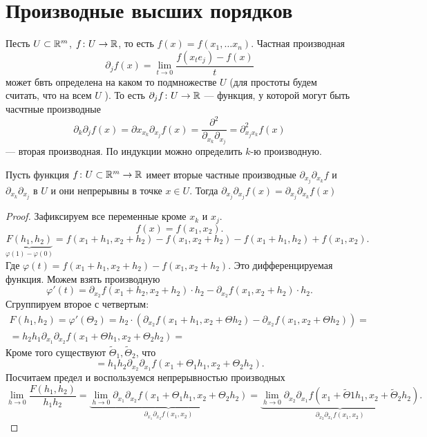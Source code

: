 \documentclass[11pt,dvipsnames]{report}
\begin{document}
\section{Производные высших порядков}
\begin{defn}
    Песть $ U \subset \mathbb{R}^{m} $, $ f\colon U \to  \mathbb{R}$, то есть $ f(x) = f(x_1, \ldots x_{n})$. Частная производная
    \[
	\partial _jf(x)  = \lim_{t \to  0} \frac{f(x_t e_j) - f(x)}{t}
    \] 
    может бвть определена на каком то подмножестве $ U$ (для простоты будем считать, что на всем  $ U$ ). То есть $ \partial _j f \colon U \to \mathbb{R}$ --- функция, у которой могут быть часчтные производные
    \[
	\partial _k \partial _j f(x) = \partial x_{x_k} \partial _{x_j}f(x) = \frac{\partial ^2}{\partial _{x_k} \partial _{x_j}} = \partial ^2_{x_j x_k} f(x)
    \] --- вторая производная. 
	По индукции можно определить  $ k$-ю производную.
\end{defn}
\begin{thm}
Пусть функция $ f\colon U \subset \mathbb{R}^{m} \to  \mathbb{R}$ имеет вторые частные производные  $ \partial _{x_j} \partial _{x_k} f$ и $ \partial _{x_k} \partial _{x_j}$ в $ U$ и они непрерывны в точке   $ x \in U$. Тогда $ \partial _{x_j} \partial _{   x_j} f(x) = \partial _{x_j} \partial _{  x_{k}}f(x)$
\end{thm}
\begin{proof}
    Зафиксируем все переменные кроме $ x_k$ и $ x_j$.
    \[
	f(x) = f(x_1, x_2)
    .\] 
    \[
	\underbrace{F(h_1, h_2)}_{ \varphi (1) - \varphi (0)} = f(x_1+h_1, x_2+h_2) - f(x_1, x_2+h_2) - f(x_1 + h_1, h_2) + f(x_1, x_2)
    .\] 
    Где $ \varphi (t) = f(x_1+h_1, x_2+h_2) - f(x_1, x_2+h_2)$.
    Это дифференцируемая функция. Можем взять производную
    \[
	\varphi '(t) = \partial _{x_2}f(x_1 + h_2, x_2+h_2) \cdot h_2 - \partial _{x_2}f(x_1, x_2+h_2)\cdot h_2 
    .\] 
    Сгруппируем второе с четвертым:
    $$
    \begin{aligned}
	F(h_1, h_2) = \varphi '( \Theta_2) = h_2  \cdot \left( \partial _{x_2}f(x_1 + h_1, x_2+\Theta h_2) - \partial _{x_2}f(x_1, x_2+ \Theta h_2) \right)  = \\
	= h_2 h_1 \partial _{x_1} \partial _{x_2} f(x_1+ \Theta h_1, x_2+ \Theta_2 h_2) = 
    \end{aligned}
    $$
    Кроме того существуют $ \tilde \Theta_1, \tilde \Theta_2$, что
    \[
	= h_1 h_2  \partial _{x_2} \partial _{x_1} f(x_1 + \Theta_1 h_1, x_2+ \Theta_2 h_2)
    .\] 
    Посчитаем предел  и воспользуемся непрерывностью производных
    \[
	\lim_{h \to  0} \frac{F(h_1, h_2)}{h_1h_2}  = \underbrace{\lim_{h \to  0} \partial _{x_1} \partial _{   x_2 }f(x_1 + \Theta_1 h_1, x_2 + \Theta_2 h_2)}_{\partial _{x_1} \partial _{x_2} f(x_1, x_2)} = \underbrace{\lim_{h \to  0} \partial _{x_2} \partial _{x_1} f(x_1 + \tilde \Theta 1 h_1, x_2 + \tilde \Theta_2 h_2) }_{\partial _{x_2} \partial _{x_1} f(x_1, x_2)}
    .\] 
\end{proof}
\end{document}

